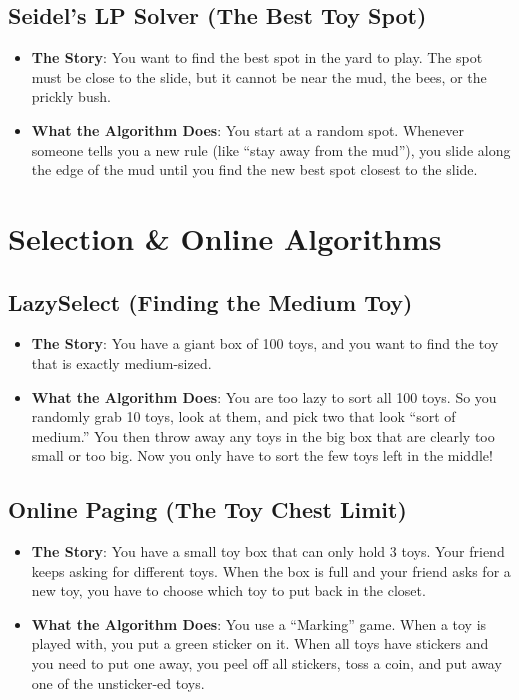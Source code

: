 \documentclass[twoside,12pt]{book}
\theoremstyle{plain}
\theoremstyle{definition}
\theoremstyle{remark}
\begin{document}
\subsection{Seidel's LP Solver (The Best Toy Spot)}
\begin{itemize}
    \item \textbf{The Story}: You want to find the best spot in the yard to play. The spot must be close to the slide, but it cannot be near the mud, the bees, or the prickly bush.
    \item \textbf{What the Algorithm Does}: You start at a random spot. Whenever someone tells you a new rule (like ``stay away from the mud''), you slide along the edge of the mud until you find the new best spot closest to the slide.
\end{itemize}

\section{Selection \& Online Algorithms}

\subsection{LazySelect (Finding the Medium Toy)}
\begin{itemize}
    \item \textbf{The Story}: You have a giant box of 100 toys, and you want to find the toy that is exactly medium-sized.
    \item \textbf{What the Algorithm Does}: You are too lazy to sort all 100 toys. So you randomly grab 10 toys, look at them, and pick two that look ``sort of medium.'' You then throw away any toys in the big box that are clearly too small or too big. Now you only have to sort the few toys left in the middle!
\end{itemize}

\subsection{Online Paging (The Toy Chest Limit)}
\begin{itemize}
    \item \textbf{The Story}: You have a small toy box that can only hold 3 toys. Your friend keeps asking for different toys. When the box is full and your friend asks for a new toy, you have to choose which toy to put back in the closet.
    \item \textbf{What the Algorithm Does}: You use a ``Marking'' game. When a toy is played with, you put a green sticker on it. When all toys have stickers and you need to put one away, you peel off all stickers, toss a coin, and put away one of the unsticker-ed toys.
\end{itemize}
\end{document}
